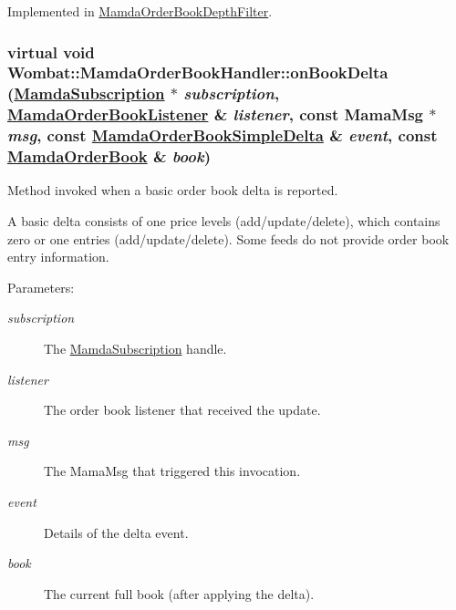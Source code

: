 Implemented in \hyperlink{classMamdaOrderBookDepthFilter_5d9d813f0c49a0afe232d333a46236c8}{Mamda\-Order\-Book\-Depth\-Filter}.\hypertarget{classWombat_1_1MamdaOrderBookHandler_b24be779d6029bfcc87ad85f469aa89f}{
\subsubsection[onBookDelta]{\setlength{\rightskip}{0pt plus 5cm}virtual void Wombat::Mamda\-Order\-Book\-Handler::on\-Book\-Delta (\hyperlink{classWombat_1_1MamdaSubscription}{Mamda\-Subscription} $\ast$ {\em subscription}, \hyperlink{classWombat_1_1MamdaOrderBookListener}{Mamda\-Order\-Book\-Listener} \& {\em listener}, const Mama\-Msg $\ast$ {\em msg}, const \hyperlink{classWombat_1_1MamdaOrderBookSimpleDelta}{Mamda\-Order\-Book\-Simple\-Delta} \& {\em event}, const \hyperlink{classWombat_1_1MamdaOrderBook}{Mamda\-Order\-Book} \& {\em book})}}
\label{classWombat_1_1MamdaOrderBookHandler_b24be779d6029bfcc87ad85f469aa89f}


Method invoked when a basic order book delta is reported. 

A basic delta consists of one price levels (add/update/delete), which contains zero or one entries (add/update/delete). Some feeds do not provide order book entry information.

\begin{Desc}
\item[Parameters:]
\begin{description}
\item[{\em subscription}]The \hyperlink{classWombat_1_1MamdaSubscription}{Mamda\-Subscription} handle. \item[{\em listener}]The order book listener that received the update. \item[{\em msg}]The Mama\-Msg that triggered this invocation. \item[{\em event}]Details of the delta event. \item[{\em book}]The current full book (after applying the delta). \end{description}
\end{Desc}


